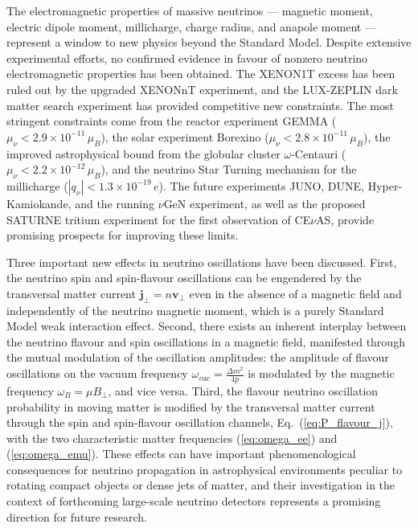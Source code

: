 \documentclass[a4paper,11pt]{article}
\begin{document}
The electromagnetic properties of massive neutrinos --- magnetic moment, electric dipole moment, millicharge, charge radius, and anapole moment --- represent a window to new physics beyond the Standard Model. Despite extensive experimental efforts, no confirmed evidence in favour of nonzero neutrino electromagnetic properties has been obtained. The XENON1T excess has been ruled out by the upgraded XENONnT experiment, and the LUX-ZEPLIN dark matter search experiment has provided competitive new constraints. The most stringent constraints come from the reactor experiment GEMMA ($\mu_\nu < 2.9 \times 10^{-11}\,\mu_B$), the solar experiment Borexino ($\mu_\nu < 2.8 \times 10^{-11}\,\mu_B$), the improved astrophysical bound from the globular cluster $\omega$-Centauri ($\mu_\nu < 2.2 \times 10^{-12}\,\mu_B$), and the neutrino Star Turning mechanism for the millicharge ($|q_\nu| < 1.3 \times 10^{-19}\,e$). The future experiments JUNO, DUNE, Hyper-Kamiokande, and the running $\nu$GeN experiment, as well as the proposed SATURNE tritium experiment for the first observation of CE$\nu$AS, provide promising prospects for improving these limits.

Three important new effects in neutrino oscillations have been discussed. First, the neutrino spin and spin-flavour oscillations can be engendered by the transversal matter current $\mathbf{j}_\perp = n\mathbf{v}_\perp$ even in the absence of a magnetic field and independently of the neutrino magnetic moment, which is a purely Standard Model weak interaction effect. Second, there exists an inherent interplay between the neutrino flavour and spin oscillations in a magnetic field, manifested through the mutual modulation of the oscillation amplitudes: the amplitude of flavour oscillations on the vacuum frequency $\omega_{vac} = \frac{\Delta m^2}{4p}$ is modulated by the magnetic frequency $\omega_B = \mu B_\perp$, and vice versa. Third, the flavour neutrino oscillation probability in moving matter is modified by the transversal matter current through the spin and spin-flavour oscillation channels, Eq.~(\ref{eq:P_flavour_j}), with the two characteristic matter frequencies (\ref{eq:omega_ee}) and (\ref{eq:omega_emu}). These effects can have important phenomenological consequences for neutrino propagation in astrophysical environments peculiar to rotating compact objects or dense jets of matter, and their investigation in the context of forthcoming large-scale neutrino detectors represents a promising direction for future research.


\end{document}
